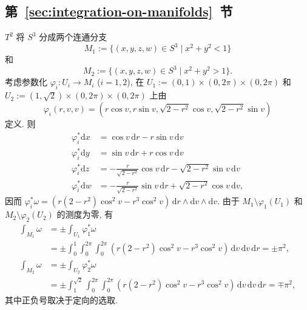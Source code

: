 \subsection{\texorpdfstring{第~\ref{sec:integration-on-manifolds}~节}{流形上的积分}}\label{subsec:solutions-integration-on-manifolds}

\begin{description}[font=\normalfont,leftmargin=2em,labelwidth=1.5em]
$T^2$ 将 $S^3$ 分成两个连通分支
\[
  M_1:=\{(x,y,z,w)\in S^3\mid x^2+y^2<1\}
\]
和
\[
  M_2:=\{(x,y,z,w)\in S^3\mid x^2+y^2>1\}.
\]
考虑参数化 $\varphi_i:U_i\to M_i$ ($i=1,2$), 在 $U_1:=(0,1)\times(0,2\pi)\times(0,2\pi)$ 和 $U_2:=(1,\sqrt2)\times(0,2\pi)\times(0,2\pi)$ 上由
\[
  \varphi_i(r,v,v)=\left(r\cos v,r\sin v,\sqrt{2-r^2}\cos v,\sqrt{2-r^2}\sin v\right)
\]
定义. 则
\begin{align*}
  \varphi_i^*\mathrm{d}x&=\cos v\,\mathrm{d}r-r\sin v\,\mathrm{d}v\\
  \varphi_i^*\mathrm{d}y&=\sin v\,\mathrm{d}r+r\cos v\,\mathrm{d}v\\
  \varphi_i^*\mathrm{d}z&=-\frac{r}{\sqrt{2-r^2}}\cos v\,\mathrm{d}r-\sqrt{2-r^2}\sin v\,\mathrm{d}v\\
  \varphi_i^*\mathrm{d}w&=-\frac{r}{\sqrt{2-r^2}}\sin v\,\mathrm{d}r+\sqrt{2-r^2}\cos v\,\mathrm{d}v,
\end{align*}
因而 $\varphi_i^*\omega=(r(2-r^2)\cos^2 v-r^3\cos^2 v)\,\mathrm{d}r\wedge\mathrm{d}v\wedge\mathrm{d}v$. 由于 $M_1\setminus\varphi_1(U_1)$ 和 $M_2\setminus\varphi_2(U_2)$ 的测度为零, 有
\begin{align*}
  \int_{M_1}\omega&=\pm\int_{U_1}\varphi_1^*\omega\\
  &=\pm\int_0^1\int_0^{2\pi}\int_0^{2\pi}
       (r(2-r^2)\cos^2 v-r^3\cos^2 v)\,\mathrm{d}v\,\mathrm{d}v\,\mathrm{d}r=\pm\pi^2,\\
  \int_{M_2}\omega&=\pm\int_{U_2}\varphi_2^*\omega\\
  &=\pm\int_1^{\sqrt{2}}\int_0^{2\pi}\int_0^{2\pi}
       (r(2-r^2)\cos^2 v-r^3\cos^2 v)\,\mathrm{d}v\,\mathrm{d}v\,\mathrm{d}r=\mp\pi^2,
\end{align*}
其中正负号取决于定向的选取.


\end{description}
